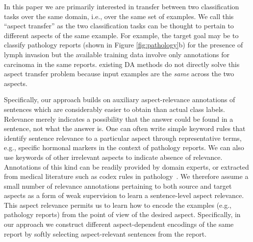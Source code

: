 In this paper we are primarily interested in transfer between two classification tasks over the same domain, i.e., over the same set of examples. We call this ``aspect transfer'' as the two classification tasks can be thought to pertain to different aspects of the same example. For example, the target goal may be to classify pathology reports (shown in Figure \ref{fig:pathology}b) for the presence of lymph invasion but the available training data involve only annotations for carcinoma in the same reports. existing DA methods do not directly solve this aspect transfer problem because input examples are the \emph{same} across the two aspects.  

 Specifically, our approach builds on auxiliary aspect-relevance annotations of sentences which are considerably easier to obtain than actual class labels. Relevance merely indicates a possibility that the answer could be found in a sentence, not what the answer is. One can often write simple keyword rules that identify sentence relevance to a particular aspect through representative terms, e.g., specific hormonal markers in the context of pathology reports. 
We can also use keywords of other irrelevant aspects to indicate absence of relevance.
Annotations of this kind can be readily provided by domain experts, or extracted from medical literature such as codex rules in pathology~\cite{pantanowitz2008informatics}. We therefore assume a small number of relevance annotations pertaining to both source and target aspects as a form of weak supervision to learn a sentence-level aspect relevance. This aspect relevance permits us to learn how to encode the examples (e.g., pathology reports) from the point of view of the desired aspect. Specifically, in our approach we construct different aspect-dependent encodings of the same report by softly selecting aspect-relevant sentences from the report.

